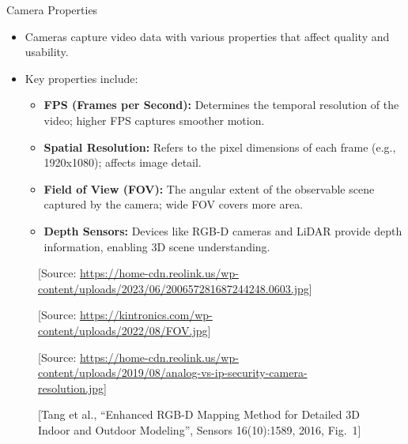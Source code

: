 \begin{frame}[allowframebreaks]{Camera Properties}
    \begin{itemize}
        \item Cameras capture video data with various properties that affect quality and usability.
        \item Key properties include:
        \begin{itemize}
            \item \textbf{FPS (Frames per Second):} Determines the temporal resolution of the video; higher FPS captures smoother motion.
            \item \textbf{Spatial Resolution:} Refers to the pixel dimensions of each frame (e.g., 1920x1080); affects image detail.
            \item \textbf{Field of View (FOV):} The angular extent of the observable scene captured by the camera; wide FOV covers more area.
            \item \textbf{Depth Sensors:} Devices like RGB-D cameras and LiDAR provide depth information, enabling 3D scene understanding.
        \end{itemize}
    \end{itemize}
\framebreak
    \begin{figure}
        \centering
        \caption*{\tiny [Source: \url{https://home-cdn.reolink.us/wp-content/uploads/2023/06/200657281687244248.0603.jpg}]}
    \end{figure}
\framebreak
    \begin{figure}
        \centering
        \caption*{\tiny [Source: \url{https://kintronics.com/wp-content/uploads/2022/08/FOV.jpg}]}
    \end{figure}
\framebreak
    \begin{figure}
        \centering
        \caption*{\tiny [Source: \url{https://home-cdn.reolink.us/wp-content/uploads/2019/08/analog-vs-ip-security-camera-resolution.jpg}]}
    \end{figure}
\framebreak
    \begin{figure}
        \centering
        \caption*{\tiny [Tang et al., ``Enhanced RGB-D Mapping Method for Detailed 3D Indoor and Outdoor Modeling'', Sensors 16(10):1589, 2016, Fig.~1]}
    \end{figure}
\end{frame}

